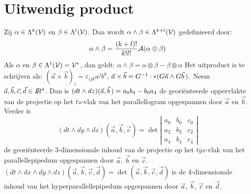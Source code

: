 \documentclass[twoside]{report}
\begin{document}
\section{Uitwendig product}
Zij $\alpha\in\Lambda^k(\cal V)$ en $\beta\in\Lambda^l(\cal V)$. Dan wordt
$\alpha\wedge\beta\in\Lambda^{k+l}(\cal V)$ gedefinieerd door:
\[
\alpha\wedge\beta=\frac{(k+l)!}{k!l!}{\cal A}(\alpha\otimes\beta)
\]
Als $\alpha$ en $\beta\in\Lambda^1(\cal V)={\cal V}^*$, dan geldt:
$\alpha\wedge\beta=\alpha\otimes\beta-\beta\otimes\alpha$
\npar
Het uitproduct is te schrijven als: $(\vec{a}\times\vec{b})_i=\varepsilon_{ijk}a^jb^k$,
$\vec{a}\times\vec{b}=G^{-1}\cdot*(G\vec{a}\wedge G\vec{b}\,)$.
\npar
Neem $\vec{a},\vec{b},\vec{c},\vec{d}\in I\hspace{-1mm}R^4$. Dan is
$(dt\wedge dz)(\vec{a},\vec{b}\,)=a_0b_4-b_0a_4$ de geori\"enteerde oppervlakte
van de projectie op het $tz$-vlak van het parallellogram opgespannen door
$\vec{a}$ en $\vec{b}$.
\npar
Verder is
\[
(dt\wedge dy\wedge dz)(\vec{a},\vec{b},\vec{c})=\det\left|\begin{array}{ccc}
a_0&b_0&c_0\\ a_2&b_2&c_2\\ a_4&b_4&c_4 \end{array}\right|
\]
de geori\"enteerde 3-dimensionale inhoud van de projectie op het $tyz$-vlak
van het parallellepipedum opgespannen door $\vec{a}$, $\vec{b}$ en $\vec{c}$.
\npar
$(dt\wedge dx\wedge dy\wedge dz)(\vec{a},\vec{b},\vec{c},\vec{d})=\det(\vec{a},\vec{b},\vec{c},\vec{d})$
is de 4-dimensionale inhoud van het hyperparallellepipedum opgespannen door
$\vec{a}$, $\vec{b}$, $\vec{c}$ en $\vec{d}$.
\end{document}
